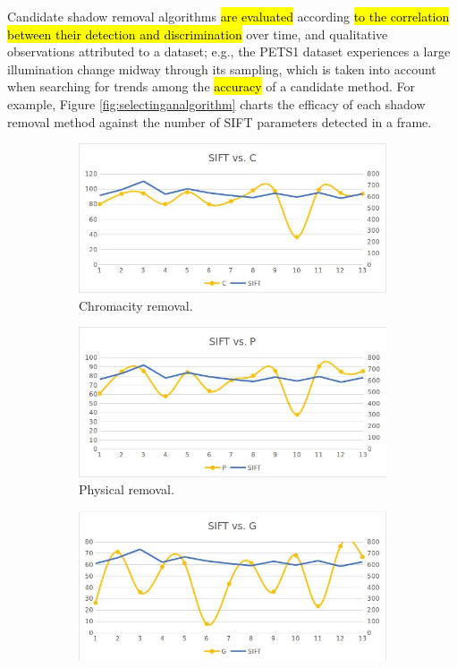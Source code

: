 \documentclass[12pt]{report}
\begin{document}
Candidate shadow removal algorithms \hl{are evaluated} according \hl{to the correlation between their detection and discrimination} over time, and qualitative observations attributed to a dataset; e.g., the PETS1 dataset experiences a large illumination change midway through its sampling, which is taken into account when searching for trends among the \hl{accuracy} of a candidate method. For example, Figure \ref{fig:selectinganalgorithm} charts the efficacy of each shadow removal method against the number of SIFT parameters detected in a frame.

\begin{figure}
\centering
\begin{subfigure}{.49\linewidth}
  \includegraphics[width=1\linewidth]{figures/selectinganalgorithm_chromacity.jpg}
  \caption{Chromacity removal.}
\end{subfigure}
\hfill
\begin{subfigure}{.49\linewidth}
  \includegraphics[width=1\linewidth]{figures/selectinganalgorithm_physical.jpg}
  \caption{Physical removal.}
\end{subfigure}
\hfill
\begin{subfigure}{.49\linewidth}
  \includegraphics[width=1\linewidth]{figures/selectinganalgorithm_geometry.jpg}

\end{subfigure}
\end{figure}
\end{document}
